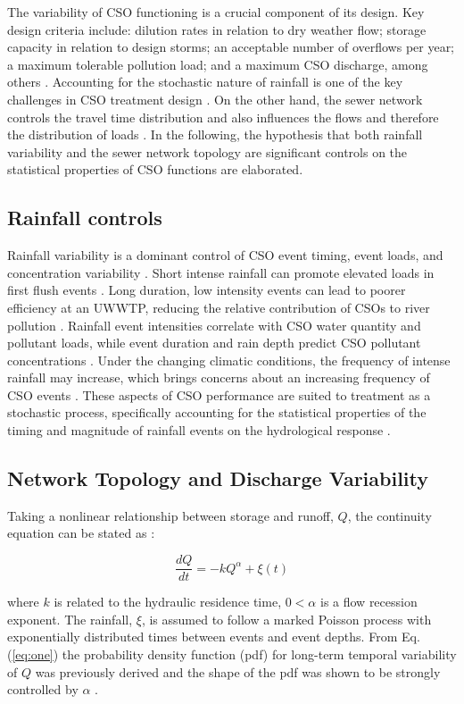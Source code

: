 \documentclass[draft,linenumbers]{agujournal2018}
\begin{document}
The variability of CSO functioning is a crucial component of its design. Key design criteria include: dilution rates in relation to dry weather f\/low; storage capacity in relation to design storms; an acceptable number of overf\/lows per year; a maximum tolerable pollution load; and a maximum CSO discharge, among others \citep{Riechel_2016}. Accounting for the stochastic nature of rainfall is one of the key challenges in CSO treatment design \citep{Geiger_1998}. On the other hand, the sewer network controls the travel time distribution and also inf\/luences the f\/lows and therefore the distribution of loads \citep{LHOMME_2004}. In the following, the hypothesis that both rainfall variability and the sewer network topology are signif\/icant controls on the statistical properties of CSO functions are elaborated.

\subsection{Rainfall controls}
Rainfall variability is a dominant control of CSO event timing, event loads, and concentration variability \citep{Geiger_1998,Sandoval_2013,COUTU2012477}. Short intense rainfall can promote elevated loads in f\/irst f\/lush events \citep{Krebs_1999}. Long duration, low intensity events can lead to poorer ef\/f\/iciency at an UWWTP, reducing the relative contribution of CSOs to river pollution \citep{Phillips_2012}. Rainfall event intensities correlate with CSO water quantity and pollutant loads, while event duration and rain depth predict CSO pollutant concentrations \citep{Sandoval_2013}. Under the changing climatic conditions, the frequency of intense rainfall may increase, which brings concerns about an increasing frequency of CSO events \citep{Semadeni_Davies_2008,Sterk_2016}. These aspects of CSO performance are suited to treatment as a stochastic process, specif\/ically accounting for the statistical properties of the timing and magnitude of rainfall events on the hydrological response \citep{Botter_2009}.
     
\subsection{Network Topology and Discharge Variability}
Taking a nonlinear relationship between storage and runof\/f, $Q$, the continuity equation can be stated as \citep{Botter_2009}:
\begin{linenomath*}
\begin{equation}
\frac{dQ}{dt} = -k Q^\alpha+\xi(t)
\label{eq:one}
\end{equation}
\end{linenomath*}
where $k$ is related to the hydraulic residence time, $0< \alpha$ is a f\/low recession exponent. The rainfall, $\xi$, is assumed to follow a marked Poisson process with exponentially distributed times between events and event depths. From Eq. (\ref{eq:one}) the probability density function (pdf) for long-term temporal variability of $Q$ was previously derived and the shape of the pdf was shown to be strongly controlled by $\alpha$ \citep{Botter_2009}.
\end{document}
